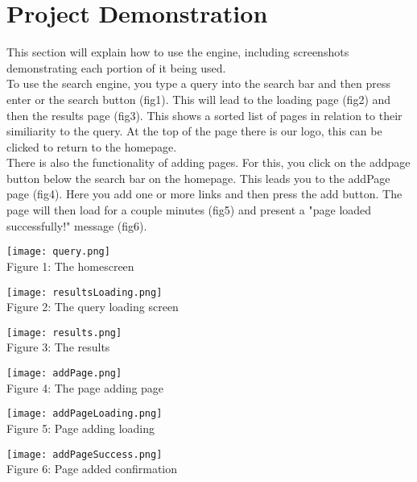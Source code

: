\section{Project Demonstration}
This section will explain how to use the engine, including screenshots demonstrating each portion of it being used. \\
To use the search engine, you type a query into the search bar and then press enter or the search button (fig1). This will lead to the loading page (fig2) and then the results page (fig3). This shows a sorted list of pages in relation to their similiarity to the query. At the top of the page there is our logo, this can be clicked to return to the homepage.\\
There is also the functionality of adding pages. For this, you click on the addpage button below the search bar on the homepage. This leads you to the addPage page (fig4). Here you add one or more links and then press the add button. The page will then load for a couple minutes (fig5) and present a "page loaded successfully!" message (fig6). 

\texttt{[image: query.png]}\\
Figure 1: The homescreen

\texttt{[image: resultsLoading.png]}\\
Figure 2: The query loading screen

\texttt{[image: results.png]}\\
Figure 3: The results

\texttt{[image: addPage.png]}\\
Figure 4: The page adding page

\texttt{[image: addPageLoading.png]}\\
Figure 5: Page adding loading

\texttt{[image: addPageSuccess.png]}\\
Figure 6: Page added confirmation
